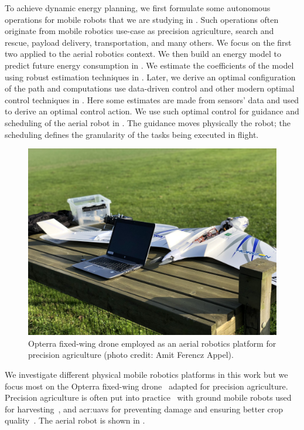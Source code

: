 To achieve dynamic energy planning, we first formulate some autonomous operations for mobile robots that we are studying in . Such operations often originate from mobile robotics use-case as precision agriculture, search and rescue, payload delivery, transportation, and many others. We focus on the first two applied to the aerial robotics context. We then build an energy model to predict future energy consumption in . We estimate the coefficients of the model using robust estimation techniques in . Later, we derive an optimal configuration of the path and computations use data-driven control and other modern optimal control techniques in . Here some estimates are made from sensors' data and used to derive an optimal control action. We use such optimal control for guidance and scheduling of the aerial robot in . The guidance moves physically the robot; the scheduling defines the granularity of the tasks being executed in flight.

\begin{figure}[t]
  \centering
  \includegraphics[width=.7\textwidth]{pictures/photo}
  \caption[Opterra fixed-wing drone]{Opterra fixed-wing drone employed as an aerial robotics platform for precision agriculture {\scriptsize(photo credit: Amit Ferencz Appel)}.}   
  \label{fig:opterra}
\end{figure}

We investigate different physical mobile robotics platforms in this work but we focus most on the Opterra fixed-wing drone~\citep{opterra} adapted for precision agriculture. Precision agriculture is often put into practice~\citep{hajjaj2014review} with ground mobile robots used for harvesting~\citep{qingchun2012study,dong2011development, de2011design, aljanobi2010setup, li2008analysis, edan2000robotic}, and \Gls{acr:uav}s for preventing damage and ensuring better crop quality~\citep{puri2017agriculture, daponte2019review}. The aerial robot is shown in .

